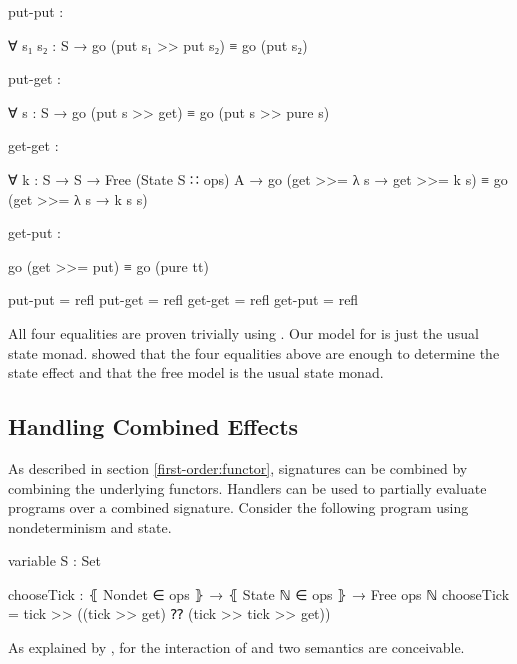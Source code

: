 \begin{code}[hide]
  put-put :
\end{code}
\begin{code}
    ∀ {s₁ s₂ : S} → go (put s₁ >> put s₂) ≡ go (put s₂)
\end{code}
\begin{code}[hide]
  put-get :
\end{code}
\begin{code}
    ∀ {s : S} → go (put s >> get) ≡ go (put s >> pure s)
\end{code}
\begin{code}[hide]
  get-get :
\end{code}
\begin{code}
    ∀ {k : S → S → Free (State S ∷ ops) A} →
      go (get >>= λ s → get >>= k s) ≡ go (get >>= λ s → k s s)
\end{code}
\begin{code}[hide]
  get-put :
\end{code}
\begin{code}
    go (get >>= put) ≡ go (pure tt)
\end{code}
\begin{code}[hide]
  put-put = refl
  put-get = refl
  get-get = refl
  get-put = refl
\end{code}
All four equalities are proven trivially using .
Our model for  is just the usual state monad.
\textcite{DBLP:conf/fossacs/PlotkinP02} showed that the four equalities above
are enough to determine the state effect and that the free model is the usual
state monad.


\subsection{Handling Combined Effects}
\label{first-order:combined-effects}

As described in section \ref{first-order:functor}, signatures can be combined by
combining the underlying functors.
Handlers can be used to partially evaluate programs over a combined signature.
Consider the following program using nondeterminism and state.

\begin{code}[hide]
variable
  S : Set
\end{code}
\begin{code}
chooseTick : ⦃ Nondet ∈ ops ⦄ → ⦃ State ℕ ∈ ops ⦄ → Free ops ℕ
chooseTick = tick >> ((tick >> get) ⁇ (tick >> tick >> get))
\end{code}
As explained by \textcite{DBLP:conf/haskell/WuSH14}, for the interaction of
 and  two semantics are conceivable.

